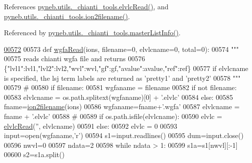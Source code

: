 References \hyperlink{__chianti__tools_8py_source_l00453}{pyneb.\-utils.\-\_\-chianti\-\_\-tools.\-elvlc\-Read()}, and \hyperlink{__chianti__tools_8py_source_l00396}{pyneb.\-utils.\-\_\-chianti\-\_\-tools.\-ion2filename()}.



Referenced by \hyperlink{__chianti__tools_8py_source_l00065}{pyneb.\-utils.\-\_\-chianti\-\_\-tools.\-master\-List\-Info()}.


\begin{DoxyCode}
\hypertarget{namespacepyneb_1_1utils_1_1__chianti__tools_l00572}{}\hyperlink{namespacepyneb_1_1utils_1_1__chianti__tools_a3ef36a1d0a4df4cab94a392d2a3da980}{00572} 
00573 \textcolor{keyword}{def }\hyperlink{namespacepyneb_1_1utils_1_1__chianti__tools_a3ef36a1d0a4df4cab94a392d2a3da980}{wgfaRead}(ions, filename=0, elvlcname=0, total=0):
00574     \textcolor{stringliteral}{"""}
00575 \textcolor{stringliteral}{    reads chianti wgfa file and returns}
00576 \textcolor{stringliteral}{    \{"lvl1":lvl1,"lvl2":lvl2,"wvl":wvl,"gf":gf,"avalue":avalue,"ref":ref\}}
00577 \textcolor{stringliteral}{    if elvlcname is specified, the lsj term labels are returned as 'pretty1' and 'pretty2'}
00578 \textcolor{stringliteral}{    """}
00579     \textcolor{comment}{#}
00580     \textcolor{keywordflow}{if} filename:
00581         wgfaname = filename
00582         \textcolor{keywordflow}{if} \textcolor{keywordflow}{not} filename:
00583             elvlcname = os.path.splitext(wgfaname)[0] + \textcolor{stringliteral}{'.elvlc'}
00584     \textcolor{keywordflow}{else}:
00585         fname=\hyperlink{namespacepyneb_1_1utils_1_1__chianti__tools_a7748521ca99103785680d691667ce851}{ion2filename}(ions)
00586         wgfaname=fname+\textcolor{stringliteral}{'.wgfa'}
00587         elvlcname = fname + \textcolor{stringliteral}{'.elvlc'}
00588     \textcolor{comment}{#}
00589     \textcolor{keywordflow}{if} os.path.isfile(elvlcname):
00590         elvlc = \hyperlink{namespacepyneb_1_1utils_1_1__chianti__tools_ac848d0b5ea14bf4adf6e8cd5d46fb639}{elvlcRead}(\textcolor{stringliteral}{''}, elvlcname)
00591     \textcolor{keywordflow}{else}:
00592         elvlc = 0
00593     input=open(wgfaname,\textcolor{stringliteral}{'}\textcolor{stringliteral}{r')}
00594 \textcolor{stringliteral}{    s1=input.readlines()}
00595 \textcolor{stringliteral}{    dum=input.close()}
00596 \textcolor{stringliteral}{    nwvl=0}
00597 \textcolor{stringliteral}{    ndata=2}
00598 \textcolor{stringliteral}{    }\textcolor{keywordflow}{while} ndata > 1:
00599         s1a=s1[nwvl][:-1]
00600         s2=s1a.split()

\end{DoxyCode}
